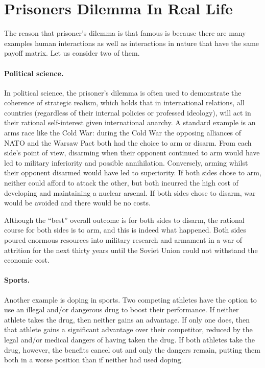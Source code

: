 \section{Prisoners Dilemma In Real Life}
The reason that prisoner's dilemma is that famous is because there are many
examples human interactions as well as interactions in nature that have the same
payoff matrix. Let us consider two of them.

\paragraph{Political science.} In political science, the prisoner's dilemma is
often used to demonstrate the coherence of strategic realism, which holds that
in international relations, all countries (regardless of their internal policies
or professed ideology), will act in their rational self-interest given
international anarchy. A standard example is an arms race like the Cold War:
during the Cold War the opposing alliances of NATO and the Warsaw Pact both had
the choice to arm or disarm. From each side's point of view, disarming when
their opponent continued to arm would have led to military inferiority and
possible annihilation. Conversely, arming whilst their opponent disarmed would
have led to superiority. If both sides chose to arm,
neither could afford to attack the other, but both incurred the high cost of
developing and maintaining a nuclear arsenal. If both sides chose to disarm, war
would be avoided and there would be no costs.

Although the ``best'' overall outcome is for both sides to disarm, the rational
course for both sides is to arm, and this is indeed what happened. Both sides
poured enormous resources into military research and armament in a war of
attrition for the next thirty years until the Soviet Union could not withstand
the economic cost. 

\paragraph{Sports.} Another example is doping in sports. Two competing athletes
have the option to use an illegal and/or dangerous drug to boost their
performance. If neither athlete takes the drug, then neither gains an advantage.
If only one does, then that athlete gains a significant advantage over their
competitor, reduced by the legal and/or medical dangers of having taken the
drug. If both athletes take the drug, however, the benefits cancel out and only
the dangers remain, putting them both in a worse position than if neither had
used doping.
